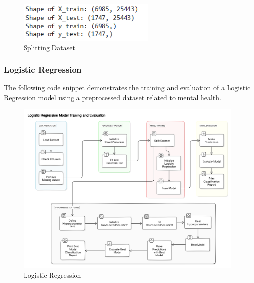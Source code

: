 \begin{figure}[h!]  
    \centering
    \includegraphics[width=0.6\textwidth]{Images/Output Splitting Dataset.png}  
    \caption{Splitting Dataset}
    \label{Splitting Dataset}  %
\end{figure}


\subsubsection{Logistic Regression}
\noindent
The following code snippet demonstrates the training and evaluation of a Logistic Regression model using a preprocessed dataset related to mental health.

\begin{figure}[h!]  
    \centering
    \includegraphics[width=1.0\textwidth]{Images/Logistic Regression.png}  
    \caption{Logistic Regression}
    \label{Logistic Regression}  %
\end{figure}

